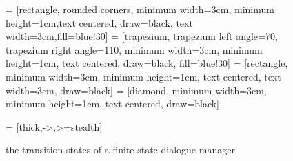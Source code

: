 \begin{figure}[H]
    \centering
 = [rectangle, rounded corners, minimum width=3cm, minimum height=1cm,text centered, draw=black, text width=3cm,fill=blue!30]
 = [trapezium, trapezium left angle=70, trapezium right angle=110, minimum width=3cm, minimum height=1cm, text centered, draw=black, fill=blue!30]
 = [rectangle, minimum width=3cm, minimum height=1cm, text centered, text width=3cm, draw=black]
 = [diamond, minimum width=3cm, minimum height=1cm, text centered, draw=black]

 = [thick,->,>=stealth]

\caption{the transition states of a finite-state dialogue manager}
\label{fig:FSA}
\end{figure}